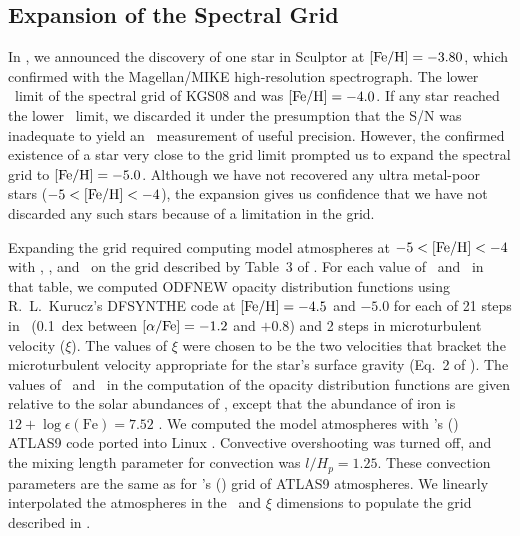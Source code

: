 \documentclass{emulateapj}
\begin{document}

\subsection{Expansion of the Spectral Grid}
\label{sec:grid}

In \citeauthor*{kir09}, we announced the discovery of one star in
Sculptor at ${\rm [Fe/H]} = -3.80$, which \citet*{fre10a} confirmed with
the Magellan/MIKE high-resolution spectrograph.  The lower \feh\ limit
of the spectral grid of KGS08 and \citeauthor*{kir09} was ${\rm [Fe/H]} =
-4.0$.  If any star reached the lower \feh\ limit, we discarded it
under the presumption that the S/N was inadequate to yield an
\feh\ measurement of useful precision.  However, the confirmed
existence of a star very close to the grid limit prompted us to expand
the spectral grid to ${\rm [Fe/H]} = -5.0$.  Although we have not
recovered any ultra metal-poor stars ($-5 < {\rm [Fe/H]} < -4$), the
expansion gives us confidence that we have not discarded any such
stars because of a limitation in the grid.

Expanding the grid required computing model atmospheres at $-5 <
{\rm [Fe/H]} < -4$ with \teff, \logg, and \afe\ on the grid described by
Table~3 of \citeauthor*{kir09}.  For each value of \teff\ and
\logg\ in that table, we computed ODFNEW opacity distribution
functions \citep{cas04} using R.~L.~Kurucz's DFSYNTHE code
\citep[described by][]{cas05} at ${\rm [Fe/H]} = -4.5$ and $-5.0$ for each
of 21 steps in \afe\ (0.1~dex between ${\rm [\alpha/Fe]} = -1.2$ and $+0.8$)
and 2 steps in microturbulent velocity ($\xi$).  The values of $\xi$
were chosen to be the two velocities that bracket the microturbulent
velocity appropriate for the star's surface gravity (Eq.~2 of
\citeauthor*{kir09}).  The values of \feh\ and \xfe\ in the
computation of the opacity distribution functions are given relative
to the solar abundances of \citet{and89}, except that the abundance of
iron is $12 + \log \epsilon (\mathrm{Fe}) = 7.52$ \citep[see][for an
  explanation]{sne92}.  We computed the model atmospheres with
\citeauthor{kur93}'s (\citeyear{kur93}) ATLAS9 code ported into Linux
\citep{sbo04,sbo05}.  Convective overshooting was turned off, and the
mixing length parameter for convection was $l/H_p = 1.25$.  These
convection parameters are the same as for \citeauthor{cas04}'s
(\citeyear{cas04}) grid of ATLAS9 atmospheres.  We linearly
interpolated the atmospheres in the \feh\ and $\xi$ dimensions to
populate the grid described in \citeauthor*{kir09}.
\end{document}
